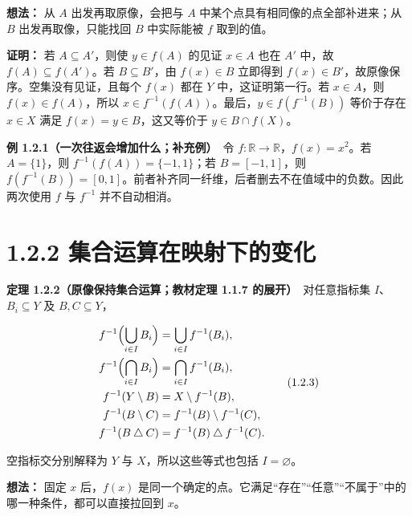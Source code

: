 \documentclass[11pt,a4paper]{article}
\begin{document}
\textbf{想法：} 从 \(A\) 出发再取原像，会把与 \(A\)
中某个点具有相同像的点全部补进来；从 \(B\) 出发再取像，只能找回 \(B\)
中实际能被 \(f\) 取到的值。

\textbf{证明：} 若 \(A\subseteq A'\)，则使 \(y\in f(A)\) 的见证
\(x\in A\) 也在 \(A'\) 中，故 \(f(A)\subseteq f(A')\)。若
\(B\subseteq B'\)，由 \(f(x)\in B\) 立即得到
\(f(x)\in B'\)，故原像保序。空集没有见证，且每个 \(f(x)\) 都在 \(Y\)
中，这证明第一行。若 \(x\in A\)，则 \(f(x)\in f(A)\)，所以
\(x\in f^{-1}(f(A))\)。最后，\(y\in f(f^{-1}(B))\) 等价于存在 \(x\in X\)
满足 \(f(x)=y\in B\)，这又等价于 \(y\in B\cap f(X)\)。

\textbf{例 1.2.1（一次往返会增加什么；补充例）}　令
\(f:\mathbb R\to\mathbb R\)，\(f(x)=x^2\)。若 \(A=\{1\}\)，则
\(f^{-1}(f(A))=\{-1,1\}\)；若 \(B=[-1,1]\)，则
\(f(f^{-1}(B))=[0,1]\)。前者补齐同一纤维，后者删去不在值域中的负数。因此两次使用
\(f\) 与 \(f^{-1}\) 并不自动相消。

\section[\S{}1.2.2
集合运算在映射下的变化]{1.2.2
集合运算在映射下的变化}\label{ux96c6ux5408ux8fd0ux7b97ux5728ux6620ux5c04ux4e0bux7684ux53d8ux5316}

\textbf{定理 1.2.2（原像保持集合运算；教材定理 1.1.7
的展开）}　对任意指标集 \(I\)、\(B_i\subseteq Y\) 及
\(B,C\subseteq Y\)，

\begin{equation*}
\begin{aligned}
f^{-1}\Bigl(\bigcup_{i\in I}B_i\Bigr)&=\bigcup_{i\in I}f^{-1}(B_i),\\
f^{-1}\Bigl(\bigcap_{i\in I}B_i\Bigr)&=\bigcap_{i\in I}f^{-1}(B_i),\\
f^{-1}(Y\setminus B)&=X\setminus f^{-1}(B),\\
f^{-1}(B\setminus C)&=f^{-1}(B)\setminus f^{-1}(C),\\
f^{-1}(B\mathbin\triangle C)&=f^{-1}(B)\mathbin\triangle f^{-1}(C).
\end{aligned}\tag{1.2.3}
\end{equation*}

空指标交分别解释为 \(Y\) 与 \(X\)，所以这些等式也包括
\(I=\varnothing\)。

\textbf{想法：} 固定 \(x\) 后，\(f(x)\)
是同一个确定的点。它满足``存在''``任意''``不属于''中的哪一种条件，都可以直接拉回到
\(x\)。
\end{document}

